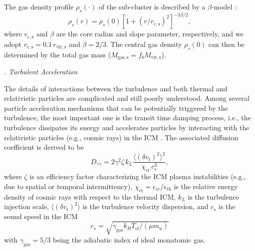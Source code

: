 \documentclass[twocolumn]{aastex62}
\newcommand{\R}[1]{\mathrm{#1}}
\newcommand{\editone}[1]{{\leavevmode\color{cyan}#1}}
\newcounter{sssseccount}
\newcommand{\sssseclabel}{\alph{sssseccount}}
\newcommand{\ssssec}[1]{%
  \vspace{1ex}%
  \stepcounter{sssseccount}%
  \noindent\emph{\sssseclabel. #1}%
}
\begin{document}
\editone{%
The gas density profile $\rho_s(\cdot)$ of the sub-cluster is described by
a $\beta$-model \citep{cavaliere1976}:
\begin{equation}
  \label{eq:beta-model}
  \rho_s(r) = \rho_s(0) \left[1 + (r / r_{\R{c,s}})^2 \right]^{-3\beta/2},
\end{equation}
where $r_{\R{c,s}}$ and $\beta$ are the core radius and slope parameter,
respectively, and we adopt $r_{\R{c,s}} = 0.1 \,r_{\R{vir,s}}$ and
$\beta = 2/3$.
The central gas density $\rho_s(0)$ can then be determined by the total gas
mass ($M_{\R{gas,s}} = f_b M_{\R{vir,s}}$).
} %

\ssssec{Turbulent Acceleration}

The details of interactions between the turbulence and both thermal and
relativistic particles are complicated and still poorly understood.
Among several particle acceleration mechanisms that can be potentially
triggered by the turbulence, the most important one is the transit time
damping process, i.e., the turbulence dissipates its energy and
accelerates particles by interacting with the relativistic particles
(e.g., cosmic rays) in the ICM
\citep[and references therein]{brunetti2007,brunetti2011}.
The associated diffusion coefficient is derived to be
\citep{miniati2015,pinzke2017}
\begin{equation}
  \label{eq:dpp}
  D_{\gamma\gamma} = 2 \gamma^2 \zeta \,k_L
    \frac{\langle (\delta v_t)^2 \rangle^2}{\chi_{\R{cr}} \, c_s^3},
\end{equation}
where
$\zeta$ is an efficiency factor characterizing the ICM plasma instabilities
(e.g., due to spatial or temporal intermittency),
$\chi_{\R{cr}} = \epsilon_{\R{cr}} / \epsilon_{\R{th}}$ is the relative
energy density of cosmic rays with respect to the thermal ICM,
\editone{$k_L$ is the turbulence injection scale},
$\langle (\delta v_t)^2 \rangle$ is the turbulence velocity dispersion,
and $c_s$ is the sound speed in the ICM
\begin{equation}
  \label{eq:sound-speed}
  c_s = \sqrt{\gamma_{\R{gas}} k_B T_{\R{cl}} / (\mu m_u)}
\end{equation}
with $\gamma_{\R{gas}} = 5/3$ being the adiabatic index
of ideal monatomic gas.
\end{document}
